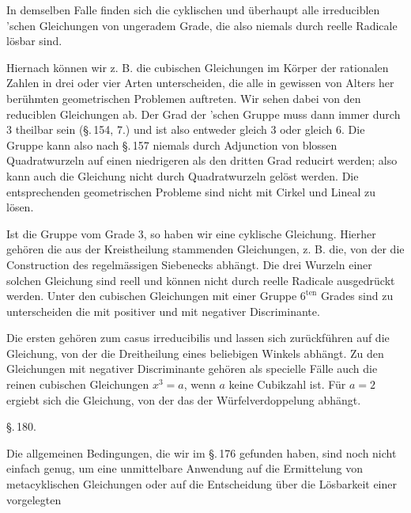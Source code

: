 In demselben Falle finden sich die cyklischen und überhaupt alle irreduciblen
'schen Gleichungen von ungeradem Grade, die also niemals durch reelle
Radicale lösbar sind.

Hiernach können wir z. B. die cubischen Gleichungen im Körper der rationalen Zahlen in
drei oder vier Arten unterscheiden, die alle in gewissen von Alters her berühmten
geometrischen Problemen auftreten. Wir sehen dabei von den reduciblen Gleichungen ab.
Der Grad der 'schen Gruppe muss dann immer durch 3 theilbar sein
(\S.\,154, 7.) und ist also entweder gleich 3 oder gleich 6. Die Gruppe kann also nach
\S.\,157 niemals durch Adjunction von blossen Quadratwurzeln auf einen niedrigeren als
den dritten Grad reducirt werden; also kann auch die Gleichung nicht durch
Quadratwurzeln gelöst werden. Die entsprechenden geometrischen Probleme sind nicht mit
Cirkel und Lineal zu lösen.

Ist die Gruppe vom Grade 3, so haben wir eine cyklische Gleichung. Hierher gehören die
aus der Kreistheilung stammenden Gleichungen, z. B. die, von der die Construction des
regelmässigen Siebenecks abhängt. Die drei Wurzeln einer solchen Gleichung sind reell
und können nicht durch reelle Radicale ausgedrückt werden. Unter den cubischen
Gleichungen mit einer Gruppe $6^{\text{ten}}$ Grades sind zu unterscheiden die mit
positiver und mit negativer Discriminante.

Die ersten gehören zum casus irreducibilis und lassen sich zurückführen auf die
Gleichung, von der die Dreitheilung eines beliebigen Winkels abhängt. Zu den
Gleichungen mit negativer Discriminante gehören als specielle Fälle auch die reinen
cubischen Gleichungen $x^3 = a$, wenn $a$ keine Cubikzahl ist. Für $a = 2$ ergiebt sich
die Gleichung, von der das  der Würfelverdoppelung abhängt.

{\centering\S.\,180.\par}
{\centering {}\par}

Die allgemeinen Bedingungen, die wir im \S.\,176 gefunden haben, sind noch nicht
einfach genug, um eine unmittelbare Anwendung auf die Ermittelung von metacyklischen
Gleichungen oder auf die Entscheidung über die Lösbarkeit einer vorgelegten
